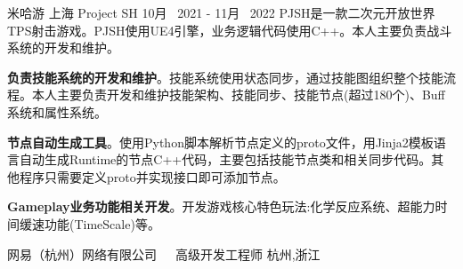 


\begin{cventries}
	
\cventrycompany
{米哈游} %
{上海} %
\cventryproject
{Project SH} %
{10月~ 2021 - 11月~ 2022} %
{PJSH是一款二次元开放世界TPS射击游戏。PJSH使用UE4引擎，业务逻辑代码使用C++。本人主要负责战斗系统的开发和维护。}
{ %
	\begin{cvitems}
		\item {\textbf{负责技能系统的开发和维护}。技能系统使用状态同步，通过技能图组织整个技能流程。本人主要负责开发和维护技能架构、技能同步、技能节点(超过180个)、Buff系统和属性系统。 }
		\item{\textbf{节点自动生成工具}。使用Python脚本解析节点定义的proto文件，用Jinja2模板语言自动生成Runtime的节点C++代码，主要包括技能节点类和相关同步代码。其他程序只需要定义proto并实现接口即可添加节点。}
		\item{\textbf{Gameplay业务功能相关开发}。开发游戏核心特色玩法:化学反应系统、超能力时间缓速功能(TimeScale)等。}
	\end{cvitems}
}


\cventrycompany
{网易（杭州）网络有限公司~~~高级开发工程师} %
{杭州,浙江} %


\end{cventries}
